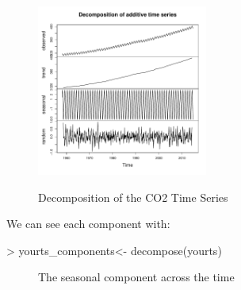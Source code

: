\documentclass[11pt, a4paper]{article} %
\begin{document}
\begin{figure}[H]
\caption{Decomposition of the CO2 Time Series}
 \begin{center}
\includegraphics[width=0.5\textwidth]{alleselena-decompose.pdf}
\label{decompose}
\end{center}
\end{figure}

\noindent We can see each component with:
\begin{Schunk}
\begin{Sinput}
> yourts_components<- decompose(yourts)
\end{Sinput}
\end{Schunk}
\begin{Schunk}
\end{Schunk}


\begin{figure}[ht]
\begin{center}
\qquad
{}
\end{center}
\caption{The seasonal component across the time}
\label{seascomp}
\end{figure}
\end{document}
